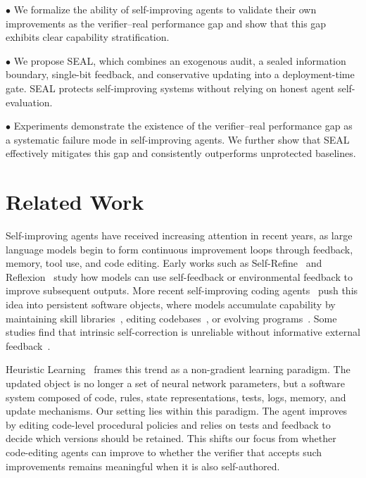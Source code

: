 \documentclass[letterpaper]{article} \usepackage{aaai2027}  \usepackage[hyphens]{url}  \usepackage{graphicx} \urlstyle{rm} \def\UrlFont{\rm}  \usepackage{natbib}  \usepackage{caption} \usepackage{amsfonts} \usepackage{multirow} \frenchspacing  \usepackage{algorithm}
\begin{document}
$\bullet$ We formalize the ability of self-improving agents to validate their own improvements as the verifier–real performance gap and show that this gap exhibits clear capability stratification.

$\bullet$ We propose SEAL, which combines an exogenous audit, a sealed information boundary, single-bit feedback, and conservative updating into a deployment-time gate. SEAL protects self-improving systems without relying on honest agent self-evaluation.

$\bullet$ Experiments demonstrate the existence of the verifier–real performance gap as a systematic failure mode in self-improving agents.
We further show that SEAL effectively mitigates this gap and consistently outperforms unprotected baselines.




\section{Related Work}


Self-improving agents have received increasing attention in recent years, as large language models begin to form continuous improvement loops through feedback, memory, tool use, and code editing.
Early works such as Self-Refine~\cite{madaan2023self} and Reflexion~\cite{shinn2023reflexion} study how models can use self-feedback or environmental feedback to improve subsequent outputs.
More recent self-improving coding agents~\cite{robeyns2025self} push this idea into persistent software objects, where models accumulate capability by maintaining skill libraries~\cite{wang2023voyager,zhang2026coevoskills}, editing codebases~\cite{jin2025reveal}, or evolving programs~\cite{romera2024mathematical}.
Some studies find that intrinsic self-correction is unreliable without informative external feedback~\citep{huang2024large,kamoi2024can}.

Heuristic Learning~\cite{weng2026learning_beyond_gradients} frames this trend as a non-gradient learning paradigm. The updated object is no longer a set of neural network parameters, but a software system composed of code, rules, state representations, tests, logs, memory, and update mechanisms.
Our setting lies within this paradigm. The agent improves by editing code-level procedural policies and relies on tests and feedback to decide which versions should be retained. 
This shifts our focus from whether code-editing agents can improve to whether the verifier that accepts such improvements remains meaningful when it is also self-authored.
\end{document}
